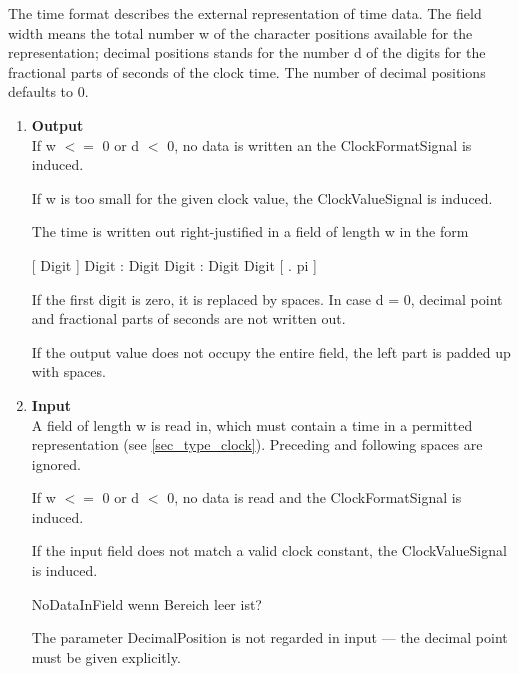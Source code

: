 The time format describes the external representation of time data. The
field width means the total number w of the character positions
available for the representation; decimal positions stands for the
number d of the digits for the fractional parts of seconds of the clock
time. 
The number of decimal positions defaults to 0.
\begin{enumerate}
\item {\bf Output}\\
If w $<=$ 0 or d $<$ 0, no data is written an the ClockFormatSignal
   is induced.

If w is too small for the given clock value, the ClockValueSignal
   is induced.

The time is written out right-justified in a field of length w in the
form

[ Digit ] Digit : Digit Digit : Digit Digit [ . pi ]

If the first digit is zero, it is replaced by spaces. In case d = 0,
decimal point and fractional parts of seconds are not written out.

If the output value does not occupy the entire field, the left part is
padded up with spaces.
\item {\bf Input}\\
A field of length w is read in, which must contain a time in a permitted
representation (see \ref{sec_type_clock}). Preceding and following spaces are ignored.

If w $<=$ 0 or d $<$ 0, no data is read and the ClockFormatSignal
   is induced.

If the input field does not match a valid clock constant, the 
   ClockValueSignal is induced.
\begin{discuss}
NoDataInField wenn Bereich leer ist?

\end{discuss}


The parameter DecimalPosition is not regarded in input
 --- the decimal point must be given explicitly.
\end{enumerate}

